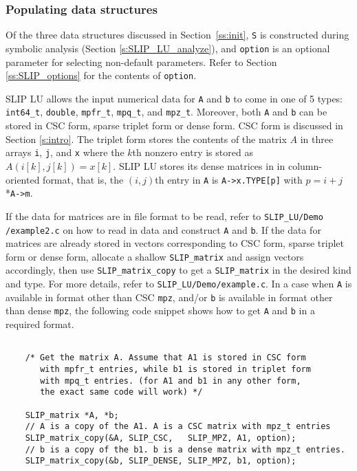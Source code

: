 \documentclass[12pt]{article}
\theoremstyle{definition}
\begin{document}
\subsubsection{Populating data structures}
\label{ss:populate_Ab}

Of the three data structures discussed in Section~\ref{ss:init}, \verb|S| is
constructed during symbolic analysis (Section \ref{s:SLIP_LU_analyze}), and
\verb|option| is an optional parameter for selecting non-default parameters.
Refer to Section \ref{ss:SLIP_options} for the contents of \verb|option|.

SLIP LU allows the input numerical data for \verb|A| and \verb|b| to come in
one of 5 types: \verb|int64_t|, \verb|double|, \verb|mpfr_t|, \verb|mpq_t|,
and \verb|mpz_t|. Moreover, both \verb|A| and \verb|b| can be stored in
CSC form, sparse triplet form or dense form. CSC form is discussed in Section
\ref{s:intro}. The triplet form stores the contents of the matrix $A$
in three arrays \verb|i|, \verb|j|, and \verb|x| where the $k$th nonzero entry
is stored as $A ( i[k], j[k]) = x[k]$. SLIP LU stores its dense matrices in
in column-oriented format, that is, the $(i,j)$th entry in \verb|A|
is \verb|A->x.TYPE[p]| with $p = i+j$*\verb|A->m|.

If the data for matrices are in file format to be read, refer to
\verb|SLIP_LU/Demo| \verb|/example2.c| on how to read in data and construct
\verb|A| and \verb|b|. If the data for matrices are already stored in vectors
corresponding to CSC form, sparse triplet form or dense form, allocate a
shallow \verb|SLIP_matrix| and assign vectors accordingly, then use
\verb|SLIP_matrix_copy| to get a \verb|SLIP_matrix| in the desired kind and
type. For more details, refer to \verb|SLIP_LU/Demo/example.c|. In a case when
\verb|A| is available in format other than CSC \verb|mpz|, and/or \verb|b| is
available in format other than dense \verb|mpz|, the following code snippet
shows how to get \verb|A| and \verb|b| in a required format.

{\small
\begin{verbatim}

    /* Get the matrix A. Assume that A1 is stored in CSC form
       with mpfr_t entries, while b1 is stored in triplet form
       with mpq_t entries. (for A1 and b1 in any other form,
       the exact same code will work) */

    SLIP_matrix *A, *b;
    // A is a copy of the A1. A is a CSC matrix with mpz_t entries
    SLIP_matrix_copy(&A, SLIP_CSC,   SLIP_MPZ, A1, option);
    // b is a copy of the b1. b is a dense matrix with mpz_t entries. 
    SLIP_matrix_copy(&b, SLIP_DENSE, SLIP_MPZ, b1, option);
    \end{verbatim} }
\end{document}

